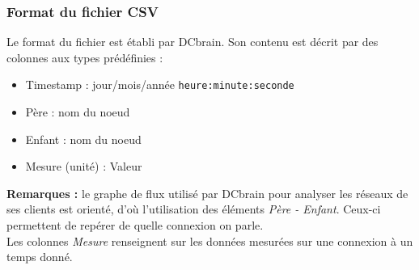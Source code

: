 			\subsubsection{Format du fichier CSV}
				Le format du fichier est établi par DCbrain. Son contenu est décrit par des colonnes aux types prédéfinies :
				\begin{itemize}
				\item Timestamp : jour/mois/année	\lstinline!heure:minute:seconde!
				\item Père : nom du noeud
				\item Enfant : nom du noeud
				\item Mesure (unité) : Valeur
				\end{itemize}
				\textbf{Remarques :} le graphe de flux utilisé par DCbrain pour analyser les réseaux de ses clients est orienté, d'où l'utilisation des éléments \textit{Père - Enfant}. Ceux-ci permettent de repérer de quelle connexion on parle.\\
				Les colonnes \textit{Mesure} renseignent sur les données mesurées sur une connexion à un temps donné.
				
